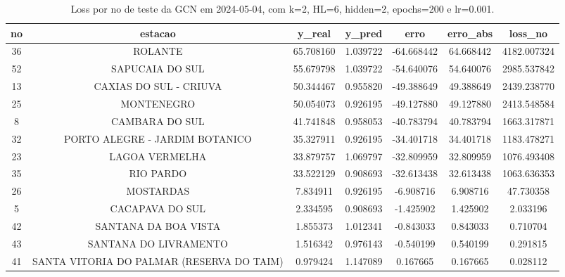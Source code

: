 \begin{table}[h]
\centering
\caption{Loss por no de teste da GCN em 2024-05-04, com k=2, HL=6, hidden=2, epochs=200 e lr=0.001.}
\label{tab:gcn_loss_k2_hl6_h2_e200_d20240504}
\begin{tabular}{ccccccc}
\toprule
no & estacao & y\_real & y\_pred & erro & erro\_abs & loss\_no \\
\midrule
36 & ROLANTE & 65.708160 & 1.039722 & -64.668442 & 64.668442 & 4182.007324 \\
52 & SAPUCAIA DO SUL & 55.679798 & 1.039722 & -54.640076 & 54.640076 & 2985.537842 \\
13 & CAXIAS DO SUL - CRIUVA & 50.344467 & 0.955820 & -49.388649 & 49.388649 & 2439.238770 \\
25 & MONTENEGRO & 50.054073 & 0.926195 & -49.127880 & 49.127880 & 2413.548584 \\
8 & CAMBARA DO SUL & 41.741848 & 0.958053 & -40.783794 & 40.783794 & 1663.317871 \\
32 & PORTO ALEGRE - JARDIM BOTANICO & 35.327911 & 0.926195 & -34.401718 & 34.401718 & 1183.478271 \\
23 & LAGOA VERMELHA & 33.879757 & 1.069797 & -32.809959 & 32.809959 & 1076.493408 \\
35 & RIO PARDO & 33.522129 & 0.908693 & -32.613438 & 32.613438 & 1063.636353 \\
26 & MOSTARDAS & 7.834911 & 0.926195 & -6.908716 & 6.908716 & 47.730358 \\
5 & CACAPAVA DO SUL & 2.334595 & 0.908693 & -1.425902 & 1.425902 & 2.033196 \\
42 & SANTANA DA BOA VISTA & 1.855373 & 1.012341 & -0.843033 & 0.843033 & 0.710704 \\
43 & SANTANA DO LIVRAMENTO & 1.516342 & 0.976143 & -0.540199 & 0.540199 & 0.291815 \\
41 & SANTA VITORIA DO PALMAR (RESERVA DO TAIM) & 0.979424 & 1.147089 & 0.167665 & 0.167665 & 0.028112 \\
\bottomrule
\end{tabular}
\end{table}
